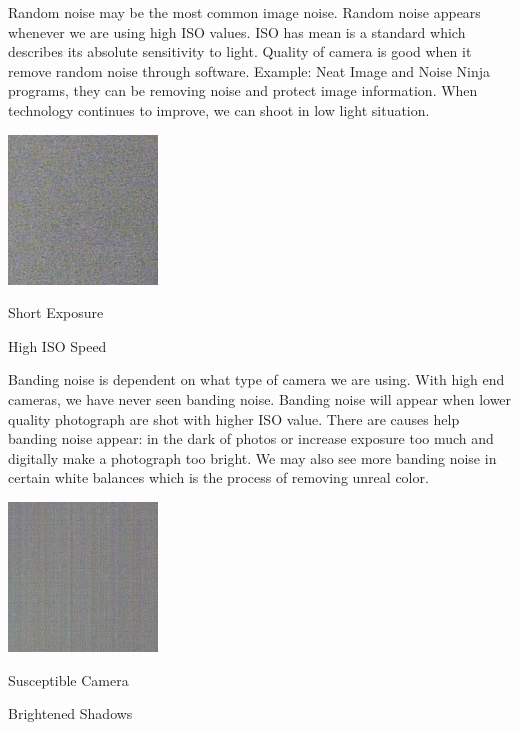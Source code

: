 Random noise may be the most common image noise. Random noise appears whenever we are using high ISO
values. ISO has mean is a standard which describes its absolute sensitivity to light. 
Quality of camera is good when it remove random noise through software. Example: Neat Image and Noise Ninja programs, they can be removing noise and protect image information. When technology continues to
improve, we can shoot in low light situation.

\begin{center}
	\includegraphics{random.png}

Short Exposure

High ISO Speed
\end{center}




Banding noise is dependent on what type of camera we are using. With high end cameras, we have never seen banding noise. Banding noise will appear when lower quality photograph are shot with higher
ISO value.
There are causes help banding noise appear: in the dark of photos or increase exposure too much and
digitally make a photograph too bright. We may also see more banding noise in certain white balances which is the process of removing unreal color.
\vspace{0.5cm}

\begin{center}
	\includegraphics{banding.png}

Susceptible Camera

Brightened Shadows
\end{center}

